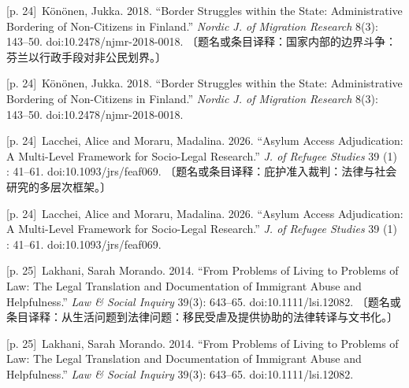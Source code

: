 \documentclass[10pt,a4paper]{article}
\begin{document}
\noindent\begin{minipage}{\textwidth}\begin{minipage}[t]{\dimexpr.5\textwidth-4mm\relax}{\scriptsize\color{gray} [p. 24]}\ Könönen, Jukka. 2018. “Border Struggles within the State: Administrative Bordering of Non-Citizens in Finland.” \textit{Nordic J. of Migration Research} 8(3): 143–50. doi:10.2478/njmr-2018-0018. 〔题名或条目译释：国家内部的边界斗争：芬兰以行政手段对非公民划界。〕\par\end{minipage}\hfill\begin{minipage}[t]{\dimexpr.5\textwidth-4mm\relax}{\scriptsize\color{gray} [p. 24]}\ Könönen, Jukka. 2018. “Border Struggles within the State: Administrative Bordering of Non-Citizens in Finland.” \textit{Nordic J. of Migration Research} 8(3): 143–50. doi:10.2478/njmr-2018-0018.\par\end{minipage}\end{minipage}\par
\noindent\begin{minipage}{\textwidth}\begin{minipage}[t]{\dimexpr.5\textwidth-4mm\relax}{\scriptsize\color{gray} [p. 24]}\ Lacchei, Alice and Moraru, Madalina. 2026. “Asylum Access Adjudication: A Multi-Level Framework for Socio-Legal Research.” \textit{J. of Refugee Studies} 39 (1) : 41–61. doi:10.1093/jrs/feaf069. 〔题名或条目译释：庇护准入裁判：法律与社会研究的多层次框架。〕\par\end{minipage}\hfill\begin{minipage}[t]{\dimexpr.5\textwidth-4mm\relax}{\scriptsize\color{gray} [p. 24]}\ Lacchei, Alice and Moraru, Madalina. 2026. “Asylum Access Adjudication: A Multi-Level Framework for Socio-Legal Research.” \textit{J. of Refugee Studies} 39 (1) : 41–61. doi:10.1093/jrs/feaf069.\par\end{minipage}\end{minipage}\par
\noindent\begin{minipage}{\textwidth}\begin{minipage}[t]{\dimexpr.5\textwidth-4mm\relax}{\scriptsize\color{gray} [p. 25]}\ Lakhani, Sarah Morando. 2014. “From Problems of Living to Problems of Law: The Legal Translation and Documentation of Immigrant Abuse and Helpfulness.” \textit{Law \& Social Inquiry} 39(3): 643–65. doi:10.1111/lsi.12082. 〔题名或条目译释：从生活问题到法律问题：移民受虐及提供协助的法律转译与文书化。〕\par\end{minipage}\hfill\begin{minipage}[t]{\dimexpr.5\textwidth-4mm\relax}{\scriptsize\color{gray} [p. 25]}\ Lakhani, Sarah Morando. 2014. “From Problems of Living to Problems of Law: The Legal Translation and Documentation of Immigrant Abuse and Helpfulness.” \textit{Law \& Social Inquiry} 39(3): 643–65. doi:10.1111/lsi.12082.\par\end{minipage}\end{minipage}\par
\end{document}
